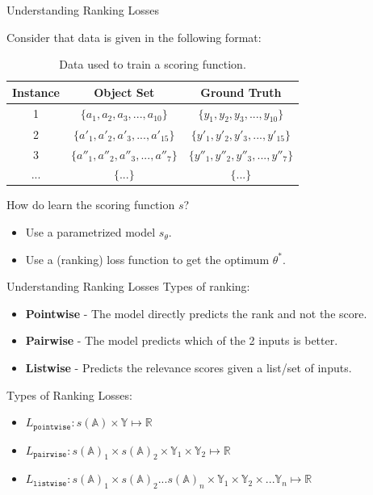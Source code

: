 \documentclass{beamer}
\begin{document}
\begin{frame}[t]{Understanding Ranking Losses}

Consider that data is given in the following format:

\begin{table} [ht]
\centering
\begin{tabular}{ | c | c | c | }
  \toprule
  Instance & Object Set & Ground Truth \\ \midrule
  1 & $\{a_1, a_2, a_3, ... , a_{10}\}$  & $\{y_1, y_2, y_3, ... , y_{10}\}$  \\
  2 & $\{a'_1, a'_2, a'_3, ... , a'_{15}\}$ & $\{y'_1, y'_2, y'_3, ... , y'_{15}\}$  \\
  3 & $\{a''_1, a''_2, a''_3, ... , a''_{7}\}$ & $\{y''_1, y''_2, y''_3, ... , y''_{7}\}$  \\
  ... & $\{...\}$ & $\{...\}$ \\
  \bottomrule
\end{tabular}
\caption{Data used to train a scoring function.}
\label {tab:dataformat}
\end{table}

How do learn the scoring function $s$?
\begin{itemize}
\item Use a parametrized model $s_{\theta}$.
\item Use a (ranking) loss function to get the optimum $\theta^*$.
\end{itemize}

\end{frame}


\begin{frame}[t]{Understanding Ranking Losses}
Types of ranking:
\begin{itemize}
\item \textbf{Pointwise} - The model directly predicts the rank and not the score.
\item \textbf{Pairwise} - The model predicts which of the 2 inputs is better.
\item \textbf{Listwise} - Predicts the relevance scores given a list/set of inputs.
\end{itemize}

Types of Ranking Losses:
\begin{itemize}
\item
$
L_{\texttt{pointwise}} : s(\mathbb{A}) \times \mathbb{Y} \mapsto \mathbb{R}
$

\item
$
L_{\texttt{pairwise}} : s(\mathbb{A})_1 \times s(\mathbb{A})_2 \times \mathbb{Y}_1 \times \mathbb{Y}_2 \mapsto \mathbb{R}
$

\item
$
L_{\texttt{listwise}} : s(\mathbb{A})_1 \times s(\mathbb{A})_2 ...  s(\mathbb{A})_{n} \times \mathbb{Y}_1 \times \mathbb{Y}_2 \times ...  \mathbb{Y}_{n} \mapsto \mathbb{R}
$

\end{itemize}

\end{frame}
\end{document}
